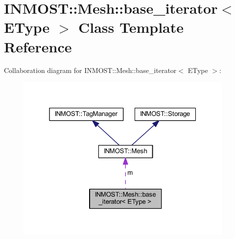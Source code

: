 \hypertarget{classINMOST_1_1Mesh_1_1base__iterator}{\section{I\-N\-M\-O\-S\-T\-:\-:Mesh\-:\-:base\-\_\-iterator$<$ E\-Type $>$ Class Template Reference}
\label{classINMOST_1_1Mesh_1_1base__iterator}
}


Collaboration diagram for I\-N\-M\-O\-S\-T\-:\-:Mesh\-:\-:base\-\_\-iterator$<$ E\-Type $>$\-:\nopagebreak
\begin{figure}[H]
\begin{center}
\leavevmode
\includegraphics[width=304pt]{classINMOST_1_1Mesh_1_1base__iterator__coll__graph}
\end{center}
\end{figure}
